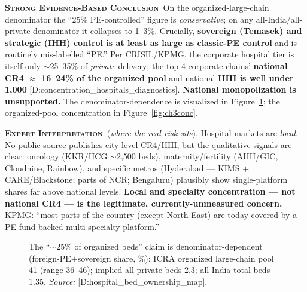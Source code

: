 \documentclass[11pt,a4paper]{article}
\newcommand{\SE}{\textcolor{secol}{\textsc{\textbf{Strong Evidence-Based Conclusion}}}}
\newcommand{\EI}{\textcolor{eicol}{\textsc{\textbf{Expert Interpretation}}}}
\newcommand{\cs}[1]{\textnormal{[#1]}}
\begin{document}
\SE\ On the organized-large-chain denominator the ``25\% PE-controlled'' figure is \emph{conservative}; on any all-India/all-private denominator it collapses to 1--3\%. Crucially, \textbf{sovereign (Temasek) and strategic (IHH) control is at least as large as classic-PE control} and is routinely mis-labelled ``PE.'' Per CRISIL/KPMG, the corporate hospital tier is itself only $\sim$25--35\% of \emph{private} delivery; the top-4 corporate chains' \textbf{national CR4 $\approx$ 16--24\% of the organized pool} and national \textbf{HHI is well under 1{,}000} \cs{D:concentration\_hospitals\_diagnostics}. \textbf{National monopolization is unsupported.} The denominator-dependence is visualized in Figure~\ref{fig:ch2denom}; the organized-pool concentration in Figure~\ref{fig:ch3conc}.

\EI\ (\emph{where the real risk sits}). Hospital markets are \emph{local}. No public source publishes city-level CR4/HHI, but the qualitative signals are clear: oncology (KKR/HCG $\sim$2{,}500 beds), maternity/fertility (AHH/GIC, Cloudnine, Rainbow), and specific metros (Hyderabad --- KIMS $+$ CARE/Blackstone; parts of NCR; Bengaluru) plausibly show single-platform shares far above national levels. \textbf{Local and specialty concentration --- not national CR4 --- is the legitimate, currently-unmeasured concern.} KPMG: ``most parts of the country (except North-East) are today covered by a PE-fund-backed multi-specialty platform.''

\begin{figure}[htbp]
\centering
{}
\caption{The ``$\sim$25\% of organized beds'' claim is denominator-dependent (foreign-PE$+$sovereign share, \%): ICRA organized large-chain pool 41 (range 36--46); implied all-private beds 2.3; all-India total beds 1.35. \textit{Source:} \cs{D:hospital\_bed\_ownership\_map}.}
\label{fig:ch2denom}
\end{figure}
\end{document}
